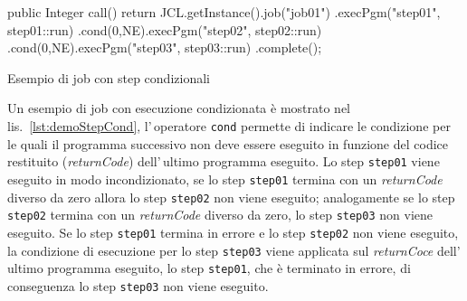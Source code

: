 \begin{elisting}[!htb]
\begin{javacode}
public Integer call() {
    return JCL.getInstance().job("job01")
        .execPgm("step01", step01::run)
        .cond(0,NE).execPgm("step02", step02::run)
        .cond(0,NE).execPgm("step03", step03::run)
        .complete();
}
\end{javacode}
\caption{Esempio di job con step condizionali}
\label{lst:demoStepCond}
\end{elisting}
Un esempio di job con esecuzione condizionata è mostrato nel
lis.~\ref{lst:demoStepCond}, l'\,operatore \texttt{cond} permette di indicare
le condizione per le quali il programma successivo non deve essere eseguito in
funzione del codice restituito (\textit{returnCode}) dell'\,ultimo programma
eseguito.
Lo step \texttt{step01} viene eseguito in modo incondizionato, se lo step
\texttt{step01} termina con un \textit{returnCode} diverso da zero allora lo
step \texttt{step02} non viene eseguito; analogamente se lo step \texttt{step02}
termina con un \textit{returnCode} diverso da zero, lo step \texttt{step03} non
viene eseguito.
Se lo step \texttt{step01} termina in errore e lo step \texttt{step02} non viene
eseguito, la condizione di esecuzione per lo step \texttt{step03} viene
applicata sul \textit{returnCoce} dell'\,ultimo programma eseguito, lo step
\texttt{step01}, che è terminato in errore, di conseguenza lo step
\texttt{step03} non viene eseguito.

